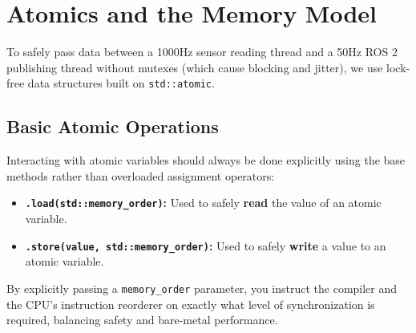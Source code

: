 \documentclass{article}
\begin{document}
\section{Atomics and the Memory Model}
To safely pass data between a 1000Hz sensor reading thread and a 50Hz ROS 2 publishing thread without mutexes (which cause blocking and jitter), we use lock-free data structures built on \texttt{std::atomic}.

\subsection{Basic Atomic Operations}
Interacting with atomic variables should always be done explicitly using the base methods rather than overloaded assignment operators:
\begin{itemize}
    \item \textbf{\texttt{.load(std::memory\_order)}:} Used to safely \textbf{read} the value of an atomic variable.
    \item \textbf{\texttt{.store(value, std::memory\_order)}:} Used to safely \textbf{write} a value to an atomic variable.
\end{itemize}
By explicitly passing a \texttt{memory\_order} parameter, you instruct the compiler and the CPU's instruction reorderer on exactly what level of synchronization is required, balancing safety and bare-metal performance.
\end{document}
